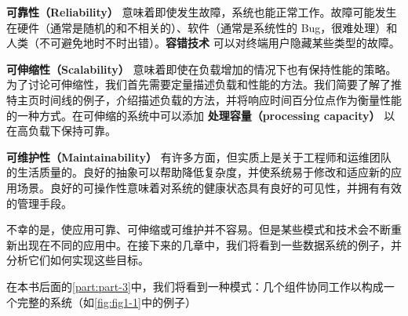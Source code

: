 \textbf{可靠性（Reliability）} 意味着即使发生故障，系统也能正常工作。故障可能发生在硬件（通常是随机的和不相关的）、软件（通常是系统性的 Bug，很难处理）和人类（不可避免地时不时出错）。\textbf{容错技术} 可以对终端用户隐藏某些类型的故障。

\textbf{可伸缩性（Scalability）} 意味着即使在负载增加的情况下也有保持性能的策略。为了讨论可伸缩性，我们首先需要定量描述负载和性能的方法。我们简要了解了推特主页时间线的例子，介绍描述负载的方法，并将响应时间百分位点作为衡量性能的一种方式。在可伸缩的系统中可以添加 \textbf{处理容量（processing capacity）} 以在高负载下保持可靠。

\textbf{可维护性（Maintainability）} 有许多方面，但实质上是关于工程师和运维团队的生活质量的。良好的抽象可以帮助降低复杂度，并使系统易于修改和适应新的应用场景。良好的可操作性意味着对系统的健康状态具有良好的可见性，并拥有有效的管理手段。

不幸的是，使应用可靠、可伸缩或可维护并不容易。但是某些模式和技术会不断重新出现在不同的应用中。在接下来的几章中，我们将看到一些数据系统的例子，并分析它们如何实现这些目标。

在本书后面的\autoref{part:part-3}中，我们将看到一种模式：几个组件协同工作以构成一个完整的系统（如\autoref{fig:fig1-1}中的例子）


